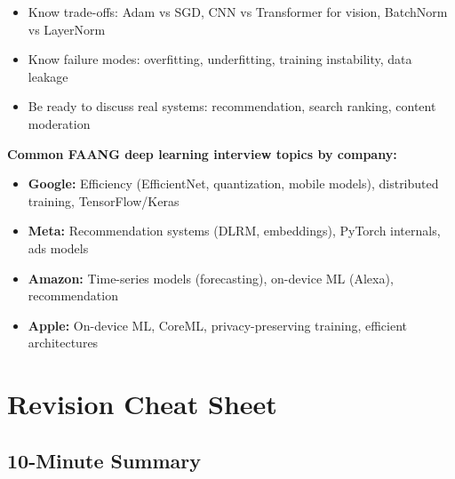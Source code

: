 \documentclass[11pt]{article}
\providecommand{\tightlist}{\setlength{\itemsep}{1pt}\setlength{\parskip}{0pt}}
\begin{document}
\begin{itemize}
\tightlist
\item
  Know trade-offs: Adam vs SGD, CNN vs Transformer for vision, BatchNorm vs LayerNorm
\item
  Know failure modes: overfitting, underfitting, training instability, data leakage
\item
  Be ready to discuss real systems: recommendation, search ranking, content moderation
\end{itemize}

\textbf{Common FAANG deep learning interview topics by company:}

\begin{itemize}
\tightlist
\item
  \textbf{Google:} Efficiency (EfficientNet, quantization, mobile models), distributed training, TensorFlow/Keras
\item
  \textbf{Meta:} Recommendation systems (DLRM, embeddings), PyTorch internals, ads models
\item
  \textbf{Amazon:} Time-series models (forecasting), on-device ML (Alexa), recommendation
\item
  \textbf{Apple:} On-device ML, CoreML, privacy-preserving training, efficient architectures
\end{itemize}

\section{Revision Cheat Sheet}\label{revision-cheat-sheet}

\subsection{10-Minute Summary}\label{10-minute-summary}
\end{document}
